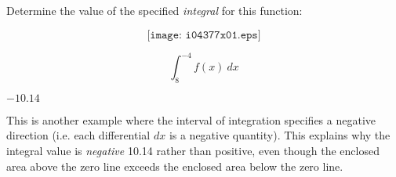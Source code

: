 

Determine the value of the specified {\it integral} for this function:

$$\texttt{[image: i04377x01.eps]}$$

$$\int_{8}^{-4} f(x) \> dx$$







$-10.14$

\vskip 10pt

This is another example where the interval of integration specifies a negative direction (i.e. each differential $dx$ is a negative quantity).  This explains why the integral value is {\it negative} 10.14 rather than positive, even though the enclosed area above the zero line exceeds the enclosed area below the zero line.











